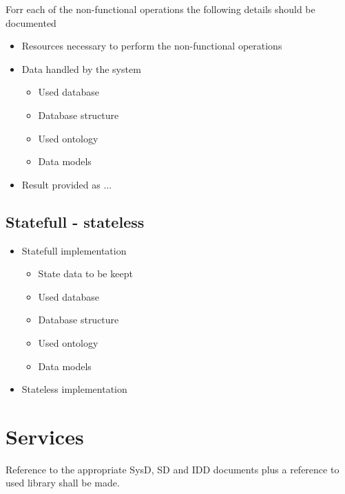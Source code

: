 \documentclass[a4paper]{arrowhead}
\begin{document}
Forr each of the non-functional operations the following details
should be documented 

\begin{itemize}
  \item Resources necessary to perform the non-functional operations
  \item Data handled by the system
    \begin{itemize}
    \item Used database
    \item Database structure
    \item Used ontology
    \item Data models
    \end{itemize}
  \item Result provided as ...
  \end{itemize}
\color{black}


\subsection {Statefull - stateless}
\color{red}
\begin{itemize}
  \item Statefull implementation 
    \begin{itemize}
    \item State data to be keept
    \item Used database
    \item Database structure
    \item Used ontology
    \item Data models
    \end{itemize}
  \item Stateless implementation
  \end{itemize}
\color{black}



\newpage

\section{Services}
\label{sec:services}

\color{red}
Reference to the appropriate SysD, SD and IDD documents plus a
reference to used library shall be made.
\end{document}
